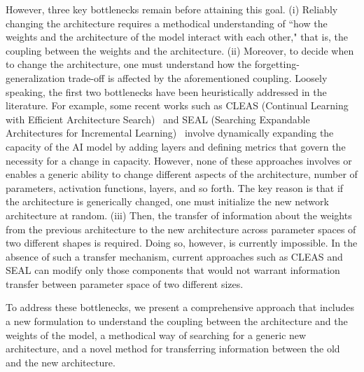However,  three key bottlenecks remain before attaining this goal. (i) Reliably changing the architecture requires a methodical understanding of ``how the weights and the architecture of the model interact with each other," that is, the coupling between the weights and the architecture. (ii) Moreover, to decide when to change the architecture, one must understand how the forgetting-generalization trade-off is affected by the aforementioned coupling. Loosely speaking, the first two bottlenecks have been heuristically addressed in the literature. For example, some recent works such as  CLEAS (Continual Learning with Efficient Architecture Search)~\cite{CLEASgao2022CLEAS} and SEAL (Searching Expandable Architectures for Incremental Learning)~\cite{SEALgambella2025SEAL} involve dynamically expanding the capacity of the AI model by adding layers and defining metrics that govern the necessity for a change in capacity. However, none of these approaches involves or enables a generic ability to change different aspects of the architecture, number of parameters, activation functions, layers, and so forth. The key reason is that if the architecture is generically changed, one must initialize the new network architecture at random. (iii) Then, the transfer of information about the weights from the previous architecture to the new architecture across parameter spaces of two different shapes is required. Doing so, however,  is currently impossible. In the absence of such a transfer mechanism, current approaches such as CLEAS and SEAL can  modify only those components that would not warrant information transfer between parameter space of two different sizes. 

To address these bottlenecks, we  present a comprehensive approach that includes a new formulation to understand the coupling between the architecture and the weights of the model, a methodical way of searching for a generic new architecture, and a novel method for transferring information between the old  and the new architecture.


